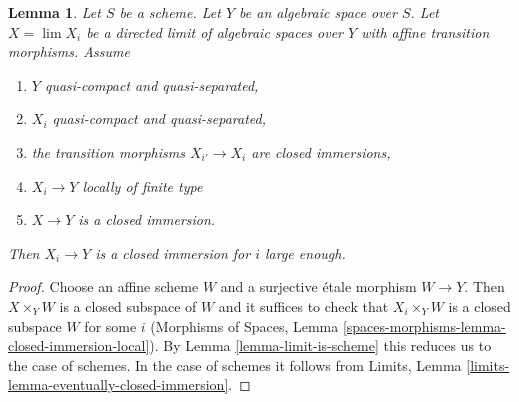 \documentclass{stacks-project}
\theoremstyle{plain}
\newtheorem{lemma}[subsection]{Lemma}
\theoremstyle{definition}
\theoremstyle{remark}
\numberwithin{equation}{subsection}
\def\lim{\mathop{\mathrm{lim}}\nolimits}
\begin{document}
\begin{lemma}
\label{lemma-eventually-closed-immersion}
Let $S$ be a scheme. Let $Y$ be an algebraic space over $S$.
Let $X = \lim X_i$ be a directed limit of algebraic spaces
over $Y$ with affine transition morphisms. Assume
\begin{enumerate}
\item $Y$ quasi-compact and quasi-separated,
\item $X_i$ quasi-compact and quasi-separated,
\item the transition morphisms $X_{i'} \to X_i$ are closed immersions,
\item $X_i \to Y$ locally of finite type
\item $X \to Y$ is a closed immersion.
\end{enumerate}
Then $X_i \to Y$ is a closed immersion for $i$ large enough.
\end{lemma}

\begin{proof}
Choose an affine scheme $W$ and a surjective \'etale morphism $W \to Y$.
Then $X \times_Y W$ is a closed subspace of $W$ and it suffices to check
that $X_i \times_Y W$ is a closed subspace $W$ for some $i$
(Morphisms of Spaces,
Lemma \ref{spaces-morphisms-lemma-closed-immersion-local}). By
Lemma \ref{lemma-limit-is-scheme} this reduces us to the case of schemes.
In the case of schemes it follows from
Limits, Lemma \ref{limits-lemma-eventually-closed-immersion}.
\end{proof}
\end{document}
